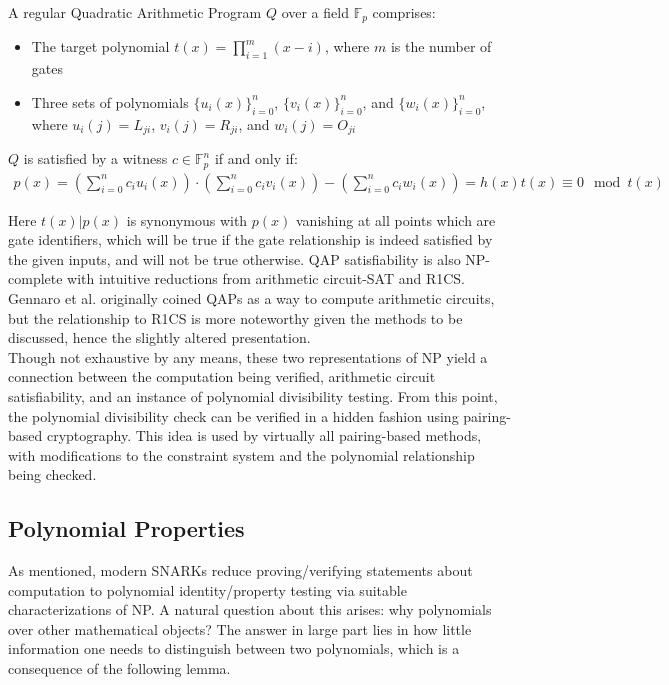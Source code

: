 \begin{definition}
A regular Quadratic Arithmetic Program $Q$ over a field $\mathbb{F}_p$ comprises:
\begin{itemize}
    \item The target polynomial $t(x) = \prod_{i=1}^m (x - i)$, where $m$ is the number of gates
    \item Three sets of polynomials $\{u_i(x)\}_{i=0}^n$, $\{v_i(x)\}_{i=0}^n$, and $\{w_i(x)\}_{i=0}^n$, where $u_i(j) = L_{ji}$, $v_i(j) = R_{ji}$, and $w_i(j) = O_{ji}$
\end{itemize}

$Q$ is satisfied by a witness $c \in \mathbb{F}_p^n$ if and only if:
\begin{align}
p(x) = \left(\sum_{i=0}^n c_i u_i(x)\right) \cdot \left(\sum_{i=0}^n c_i v_i(x)\right) - \left(\sum_{i=0}^n c_i w_i(x)\right) = h(x)t(x) \equiv 0 \mod t(x)
\end{align}
\end{definition}

\noindent Here $t(x) | p(x)$ is synonymous with $p(x)$ vanishing at all points which are gate identifiers, which will be true if the gate relationship is indeed satisfied by the given inputs, and will not be true otherwise. QAP satisfiability is also NP-complete with intuitive reductions from arithmetic circuit-SAT and R1CS. Gennaro et al. originally coined QAPs as a way to compute arithmetic circuits, but the relationship to R1CS is more noteworthy given the methods to be discussed, hence the slightly altered presentation.\\

\noindent Though not exhaustive by any means, these two representations of NP yield a connection between the computation being verified, arithmetic circuit satisfiability, and an instance of polynomial divisibility testing. From this point, the polynomial divisibility check can be verified in a hidden fashion using pairing-based cryptography. This idea is used by virtually all pairing-based methods, with modifications to the constraint system and the polynomial relationship being checked.

\subsection{Polynomial Properties}
\noindent As mentioned, modern SNARKs reduce proving/verifying statements about computation to polynomial identity/property testing via suitable characterizations of NP. A natural question about this arises: why polynomials over other mathematical objects? The answer in large part lies in how little information one needs to distinguish between two polynomials, which is a consequence of the following lemma.

